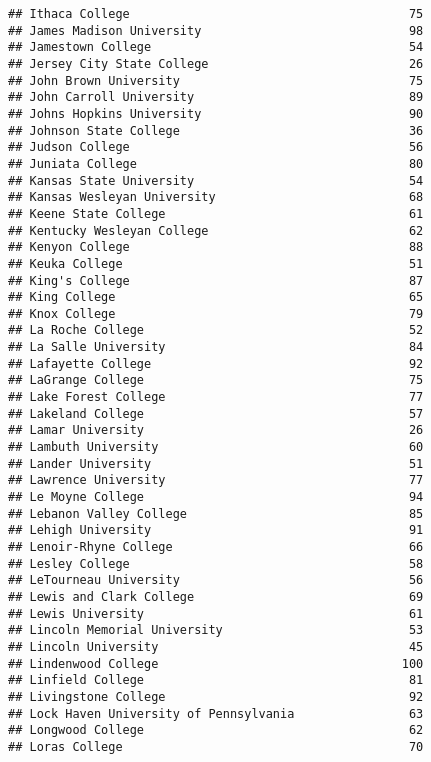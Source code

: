 \documentclass[
]{article}
\begin{document}
\begin{verbatim}
## Ithaca College                                       75
## James Madison University                             98
## Jamestown College                                    54
## Jersey City State College                            26
## John Brown University                                75
## John Carroll University                              89
## Johns Hopkins University                             90
## Johnson State College                                36
## Judson College                                       56
## Juniata College                                      80
## Kansas State University                              54
## Kansas Wesleyan University                           68
## Keene State College                                  61
## Kentucky Wesleyan College                            62
## Kenyon College                                       88
## Keuka College                                        51
## King's College                                       87
## King College                                         65
## Knox College                                         79
## La Roche College                                     52
## La Salle University                                  84
## Lafayette College                                    92
## LaGrange College                                     75
## Lake Forest College                                  77
## Lakeland College                                     57
## Lamar University                                     26
## Lambuth University                                   60
## Lander University                                    51
## Lawrence University                                  77
## Le Moyne College                                     94
## Lebanon Valley College                               85
## Lehigh University                                    91
## Lenoir-Rhyne College                                 66
## Lesley College                                       58
## LeTourneau University                                56
## Lewis and Clark College                              69
## Lewis University                                     61
## Lincoln Memorial University                          53
## Lincoln University                                   45
## Lindenwood College                                  100
## Linfield College                                     81
## Livingstone College                                  92
## Lock Haven University of Pennsylvania                63
## Longwood College                                     62
## Loras College                                        70

\end{verbatim}
\end{document}
